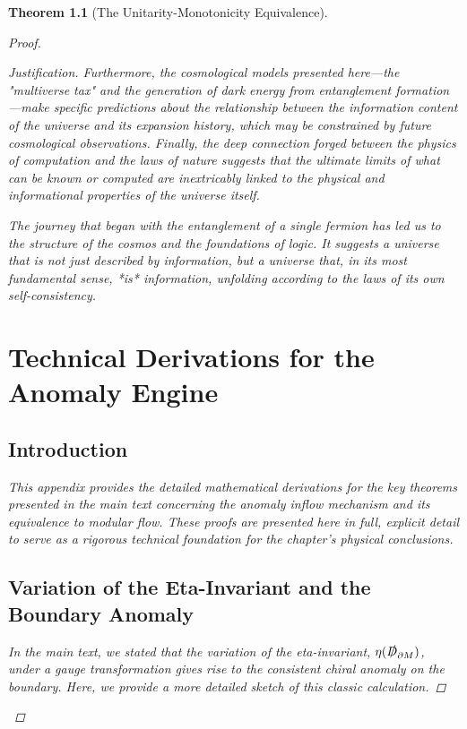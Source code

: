 \documentclass[11pt, letterpaper]{report}
\theoremstyle{plain} %
\newtheorem{theorem}{Theorem}[chapter]
\theoremstyle{definition} %
\theoremstyle{remark} %
\newcommand{\BulkM}{M}
\newcommand{\BoundaryM}{\partial\BulkM}
\newcommand{\DiracOpBoundary}{\slashed{D}_{\BoundaryM}}
\newcommand{\EtaInv}{\eta}
\begin{document}
\begin{theorem}[The Unitarity-Monotonicity Equivalence]
\begin{proof}
\begin{proof}[Justification]
Furthermore, the cosmological models presented here—the "multiverse tax" and the generation of dark energy from entanglement formation—make specific predictions about the relationship between the information content of the universe and its expansion history, which may be constrained by future cosmological observations. Finally, the deep connection forged between the physics of computation and the laws of nature suggests that the ultimate limits of what can be known or computed are inextricably linked to the physical and informational properties of the universe itself.

The journey that began with the entanglement of a single fermion has led us to the structure of the cosmos and the foundations of logic. It suggests a universe that is not just described by information, but a universe that, in its most fundamental sense, *is* information, unfolding according to the laws of its own self-consistency.




\appendix
\chapter{Technical Derivations for the Anomaly Engine}
\label{app:anomaly_engine_derivations}

\section{Introduction}

This appendix provides the detailed mathematical derivations for the key theorems presented in the main text concerning the anomaly inflow mechanism and its equivalence to modular flow. These proofs are presented here in full, explicit detail to serve as a rigorous technical foundation for the chapter's physical conclusions.

\section{Variation of the Eta-Invariant and the Boundary Anomaly}
\label{app:eta_variation}

In the main text, we stated that the variation of the eta-invariant, $\EtaInv(\DiracOpBoundary)$, under a gauge transformation gives rise to the consistent chiral anomaly on the boundary. Here, we provide a more detailed sketch of this classic calculation.


\end{proof}
\end{proof}
\end{theorem}
\end{document}
